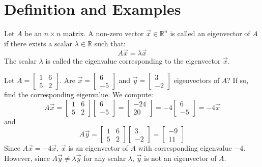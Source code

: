 \section{Definition and Examples}
\begin{definition}
    Let $A$ be an $n \times n$ matrix. A non-zero vector $\vec{x} \in \mathbb{R}^n$ is called an eigenvector of $A$ if there exists a scalar $\lambda \in \mathbb{R}$ such that:
    \[
        A \vec{x} = \lambda \vec{x}
    \]
    The scalar $\lambda$ is called the eigenvalue corresponding to the eigenvector $\vec{x}$.
\end{definition}

\begin{eg}
    Let $A = \begin{bmatrix}
        1 & 6 \\ 5 & 2
    \end{bmatrix}$. Are $\vec{x} = \begin{bmatrix}
        6 \\ -5
    \end{bmatrix}$ and $\vec{y} = \begin{bmatrix}
        3 \\ -2
    \end{bmatrix}$ eigenvectors of $A$? If so, find the corresponding eigenvalue. We compute:
    \[A \vec{x} = \begin{bmatrix}
        1 & 6 \\ 5 & 2
    \end{bmatrix} \begin{bmatrix}
        6 \\ -5
    \end{bmatrix} = \begin{bmatrix}
        -24 \\ 20
    \end{bmatrix} = -4 \begin{bmatrix}
        6 \\ -5
    \end{bmatrix} = -4 \vec{x}\]
    and
    \[A \vec{y} = \begin{bmatrix}
        1 & 6 \\ 5 & 2
    \end{bmatrix} \begin{bmatrix}
        3 \\ -2
    \end{bmatrix} = \begin{bmatrix}
        -9 \\ 11
    \end{bmatrix}\]
    Since $A \vec{x} = -4 \vec{x}$, $\vec{x}$ is an eigenvector of $A$ with corresponding eigenvalue $-4$. However, since $A \vec{y} \neq \lambda \vec{y}$ for any scalar $\lambda$, $\vec{y}$ is not an eigenvector of $A$.
\end{eg}

